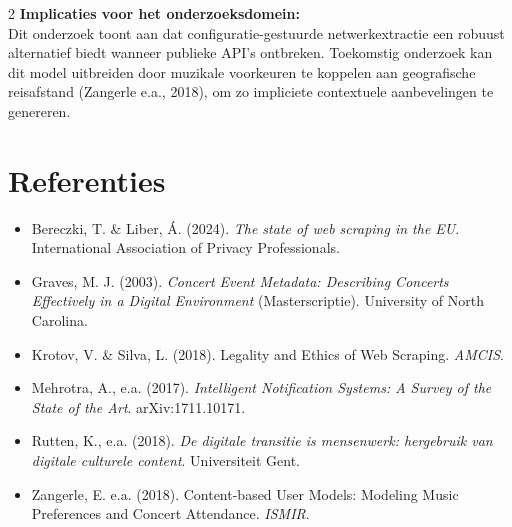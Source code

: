 \documentclass[a0,portrait]{hogent-poster}
\begin{document}
\begin{multicols}{2}
\textbf{Implicaties voor het onderzoeksdomein:} \\
Dit onderzoek toont aan dat configuratie-gestuurde netwerkextractie een robuust alternatief biedt wanneer publieke API's ontbreken. Toekomstig onderzoek kan dit model uitbreiden door muzikale voorkeuren te koppelen aan geografische reisafstand (Zangerle e.a., 2018), om zo impliciete contextuele aanbevelingen te genereren.

\section{Referenties}
\begingroup
\small
\begin{itemize}
    \item Bereczki, T. \& Liber, Á. (2024). \textit{The state of web scraping in the EU}. International Association of Privacy Professionals.
    \item Graves, M. J. (2003). \textit{Concert Event Metadata: Describing Concerts Effectively in a Digital Environment} (Masterscriptie). University of North Carolina.
    \item Krotov, V. \& Silva, L. (2018). Legality and Ethics of Web Scraping. \textit{AMCIS}.
    \item Mehrotra, A., e.a. (2017). \textit{Intelligent Notification Systems: A Survey of the State of the Art}. arXiv:1711.10171.
    \item Rutten, K., e.a. (2018). \textit{De digitale transitie is mensenwerk: hergebruik van digitale culturele content}. Universiteit Gent.
    \item Zangerle, E. e.a. (2018). Content-based User Models: Modeling Music Preferences and Concert Attendance. \textit{ISMIR}.
\end{itemize}
\endgroup

\end{multicols}
\end{document}
